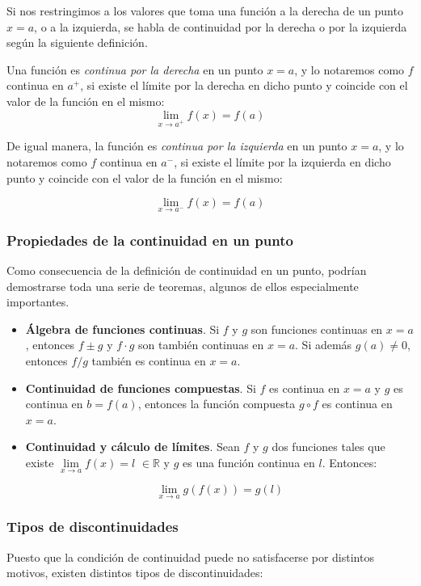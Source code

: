Si nos restringimos a los valores que toma una función a la derecha
de un punto $x=a$, o a la izquierda, se habla de continuidad por la
derecha o por la izquierda según la siguiente definición.

Una función es \emph{continua por la derecha} en un punto $x=a$, y
lo notaremos como $f$ continua en $a^+$, si existe el límite por la
derecha en dicho punto y coincide con el valor de la función en el
mismo:
\[
\mathop {\lim }\limits_{x \to a^ +  } f\left( x \right) = f\left( a
\right)
\]

De igual manera, la función es \emph{continua por la izquierda} en
un punto $x=a$, y lo notaremos como $f$ continua en $a^-$, si existe
el límite por la izquierda en dicho punto y coincide con el valor de
la función en el mismo:

\[
\mathop {\lim }\limits_{x \to a^ -  } f\left( x \right) = f\left( a
\right)
\]


\subsubsection*{Propiedades de la continuidad en un punto}

Como consecuencia de la definición de continuidad en un punto,
podrían demostrarse toda una serie de teoremas, algunos de ellos
especialmente importantes.

\begin{itemize}

\item \textbf{Álgebra de funciones continuas}.
Si $f$ y $g$ son funciones continuas en $x=a$, entonces $f\pm g$ y
$f\cdot g$ son también continuas en $x=a$. Si además $g(a)\neq 0$,
entonces $f/g$ también es continua en $x=a$.

\item \textbf{Continuidad de funciones compuestas}. Si $f$ es continua en
$x=a$ y $g$ es continua en $b=f(a)$, entonces la función compuesta
$g\circ f$ es continua en $x=a$.

\item \textbf{Continuidad y cálculo de límites}. Sean $f$ y $g$ dos
funciones tales que existe $\mathop {\lim }\limits_{x \to a} f(x) =
l$ $\in \mathbb{R}$ y $g$ es una función continua en $l$. Entonces:

\[
\mathop {\lim }\limits_{x \to a} g\left( {f\left( x \right)} \right)
= g\left( l \right)
\]

\end{itemize}

\subsubsection*{Tipos de discontinuidades}
Puesto que la condición de continuidad puede no satisfacerse por
distintos motivos, existen distintos tipos de discontinuidades:



